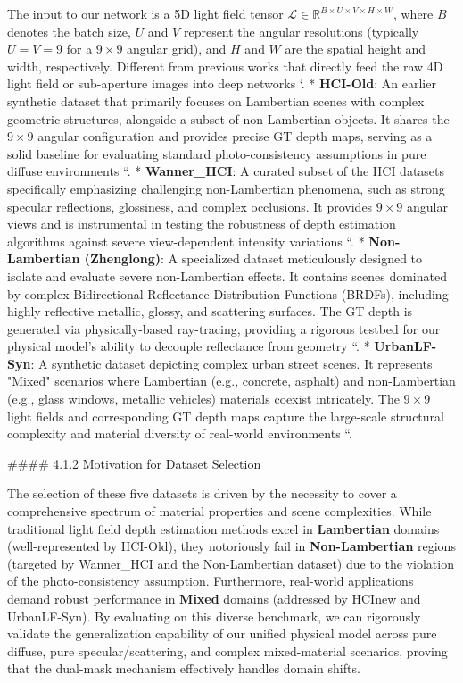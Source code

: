 The input to our network is a 5D light field tensor \(\mathcal{L} \in \mathbb{R}^{B \times U \times V \times H \times W}\), where \(B\) denotes the batch size, \(U\) and \(V\) represent the angular resolutions (typically \(U=V=9\) for a \(9 \times 9\) angular grid), and \(H\) and \(W\) are the spatial height and width, respectively. Different from previous works that directly feed the raw 4D light field or sub-aperture images into deep networks `.
*   \textbf{HCI-Old}: An earlier synthetic dataset that primarily focuses on Lambertian scenes with complex geometric structures, alongside a subset of non-Lambertian objects. It shares the \(9 \times 9\) angular configuration and provides precise GT depth maps, serving as a solid baseline for evaluating standard photo-consistency assumptions in pure diffuse environments ``.
*   \textbf{Wanner_HCI}: A curated subset of the HCI datasets specifically emphasizing challenging non-Lambertian phenomena, such as strong specular reflections, glossiness, and complex occlusions. It provides \(9 \times 9\) angular views and is instrumental in testing the robustness of depth estimation algorithms against severe view-dependent intensity variations ``.
*   \textbf{Non-Lambertian (Zhenglong)}: A specialized dataset meticulously designed to isolate and evaluate severe non-Lambertian effects. It contains scenes dominated by complex Bidirectional Reflectance Distribution Functions (BRDFs), including highly reflective metallic, glossy, and scattering surfaces. The GT depth is generated via physically-based ray-tracing, providing a rigorous testbed for our physical model's ability to decouple reflectance from geometry ``.
*   \textbf{UrbanLF-Syn}: A synthetic dataset depicting complex urban street scenes. It represents "Mixed" scenarios where Lambertian (e.g., concrete, asphalt) and non-Lambertian (e.g., glass windows, metallic vehicles) materials coexist intricately. The \(9 \times 9\) light fields and corresponding GT depth maps capture the large-scale structural complexity and material diversity of real-world environments ``.

\#\#\#\# 4.1.2 Motivation for Dataset Selection

The selection of these five datasets is driven by the necessity to cover a comprehensive spectrum of material properties and scene complexities. While traditional light field depth estimation methods excel in \textbf{Lambertian} domains (well-represented by HCI-Old), they notoriously fail in \textbf{Non-Lambertian} regions (targeted by Wanner_HCI and the Non-Lambertian dataset) due to the violation of the photo-consistency assumption. Furthermore, real-world applications demand robust performance in \textbf{Mixed} domains (addressed by HCInew and UrbanLF-Syn). By evaluating on this diverse benchmark, we can rigorously validate the generalization capability of our unified physical model across pure diffuse, pure specular/scattering, and complex mixed-material scenarios, proving that the dual-mask mechanism effectively handles domain shifts.

